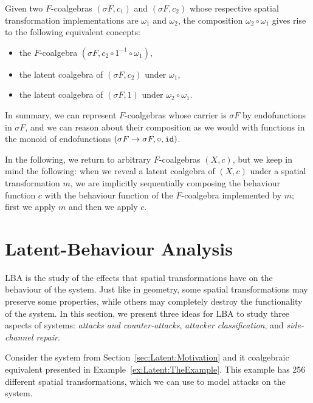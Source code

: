 Given two $F$-coalgebras $(\sigma F, c_1)$ and $(\sigma F, c_2)$ whose respective spatial transformation implementations are $\omega_1$ and $\omega_2$, the composition $\omega_2\circ \omega_1$ gives rise to the following equivalent concepts:
\begin{itemize}
    \item the $F$-coalgebra $(\sigma F, c_2\circ 1^{-1}\circ\omega_1)$,
    \item the latent coalgebra of $(\sigma F, c_2)$ under $\omega_1$,
    \item the latent coalgebra of $(\sigma F, 1)$ under $\omega_2\circ \omega_1$.
\end{itemize}
In summary, we can represent $F$-coalgebras whose carrier is $\sigma F$ by endofunctions in $\sigma F$, and we can reason about their composition as we would with functions in the monoid of endofunctions $(\sigma F\rightarrow \sigma F, \circ, {\texttt{id}})$. 

In the following, we return to arbitrary $F$-coalgebras $(X,c)$, but we keep in mind the following: when we reveal a latent coalgebra of $(X,c)$ under a spatial transformation $m$, we are implicitly sequentially composing the behaviour function $c$ with the behaviour function of the $F$-coalgebra implemented by $m$; first we apply $m$ and then we apply $c$.

\section{Latent-Behaviour Analysis}
LBA is the study of the effects that spatial transformations have on the behaviour of the system. Just like in geometry, some spatial transformations may preserve some properties, while others may completely destroy the functionality of the system. In this section, we present three ideas for LBA to study three aspects of systems: \emph{attacks and counter-attacks}, \emph{attacker classification}, and \emph{side-channel repair}.

Consider the system from Section~\ref{sec:Latent:Motivation} and it coalgebraic equivalent presented in Example~\ref{ex:Latent:TheExample}. This example has 256 different spatial transformations, which we can use to model attacks on the system. 

